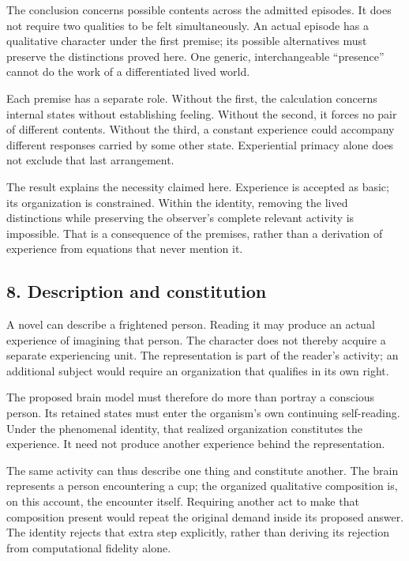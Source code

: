 \documentclass[
  11pt,
]{article}
\begin{document}
The conclusion concerns possible contents across the admitted episodes.
It does not require two qualities to be felt simultaneously. An actual
episode has a qualitative character under the first premise; its
possible alternatives must preserve the distinctions proved here. One
generic, interchangeable ``presence'' cannot do the work of a
differentiated lived world.

Each premise has a separate role. Without the first, the calculation
concerns internal states without establishing feeling. Without the
second, it forces no pair of different contents. Without the third, a
constant experience could accompany different responses carried by some
other state. Experiential primacy alone does not exclude that last
arrangement.

The result explains the necessity claimed here. Experience is accepted
as basic; its organization is constrained. Within the identity, removing
the lived distinctions while preserving the observer's complete relevant
activity is impossible. That is a consequence of the premises, rather
than a derivation of experience from equations that never mention it.

\subsection{8. Description and
constitution}\label{description-and-constitution}

A novel can describe a frightened person. Reading it may produce an
actual experience of imagining that person. The character does not
thereby acquire a separate experiencing unit. The representation is part
of the reader's activity; an additional subject would require an
organization that qualifies in its own right.

The proposed brain model must therefore do more than portray a conscious
person. Its retained states must enter the organism's own continuing
self-reading. Under the phenomenal identity, that realized organization
constitutes the experience. It need not produce another experience
behind the representation.

The same activity can thus describe one thing and constitute another.
The brain represents a person encountering a cup; the organized
qualitative composition is, on this account, the encounter itself.
Requiring another act to make that composition present would repeat the
original demand inside its proposed answer. The identity rejects that
extra step explicitly, rather than deriving its rejection from
computational fidelity alone.
\end{document}
